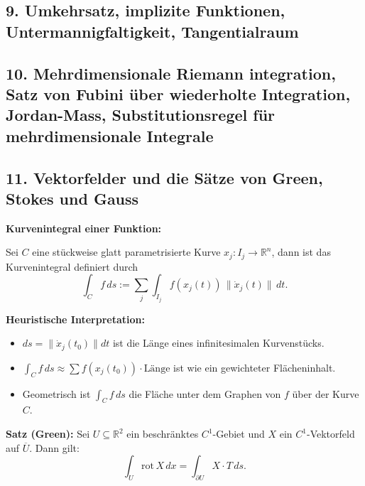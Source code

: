 \subsection{9. Umkehrsatz, implizite Funktionen, Untermannigfaltigkeit, Tangentialraum}



\subsection{10. Mehrdimensionale Riemann integration, Satz von Fubini über wiederholte Integration, Jordan-Mass, Substitutionsregel für mehrdimensionale Integrale}


\subsection{11. Vektorfelder und die 
Sätze von Green, Stokes und Gauss}

\textbf{Kurvenintegral einer Funktion:}

Sei $C$ eine stückweise glatt parametrisierte Kurve $x_j : I_j \to \mathbb{R}^n$, dann ist das Kurvenintegral definiert durch
\[
\int_C f \, ds := \sum_j \int_{I_j} f(x_j(t)) \, \lVert \dot{x}_j(t) \rVert \, dt.
\]

\textbf{Heuristische Interpretation:}

\begin{itemize}
  \item $ds = \lVert \dot{x}_j(t_0) \rVert dt$ ist die Länge eines infinitesimalen Kurvenstücks.
  \item $\int_C f \, ds \approx \sum f(x_j(t_0)) \cdot \text{Länge}$ ist wie ein gewichteter Flächeninhalt.
  \item Geometrisch ist $\int_C f \, ds$ die Fläche unter dem Graphen von $f$ über der Kurve $C$.
\end{itemize}

\textbf{Satz (Green):}
Sei $U \subseteq \mathbb{R}^2$ ein beschränktes $C^1$-Gebiet und $X$ ein $C^1$-Vektorfeld auf $\overline{U}$. Dann gilt:
\[
\int_U \mathrm{rot}\, X \, dx = \int_{\partial U} X \cdot T \, ds.
\]

